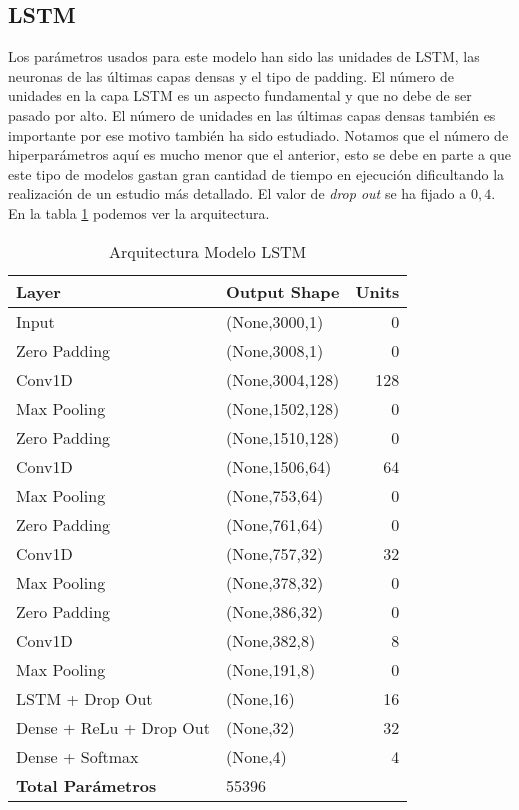     \subsection{LSTM}
        Los parámetros usados para este modelo han sido las unidades de LSTM, las neuronas de las últimas capas densas y el tipo de padding. El número de unidades en la capa LSTM es un aspecto fundamental y que no debe de ser pasado por alto. El número de unidades en las últimas capas densas también es importante por ese motivo también ha sido estudiado. Notamos que el número de hiperparámetros aquí es mucho menor que el anterior, esto se debe en parte a que este tipo de modelos gastan gran cantidad de tiempo en ejecución dificultando la realización de un estudio más detallado. El valor de \textit{drop out} se ha fijado a $0,4$. En la tabla \ref{table:arquitectura modelo lstm} podemos ver la arquitectura. \\
        
    
        \begin{table}[htpb]
            \caption{Arquitectura Modelo LSTM}
            \begin{center}
            \begin{tabular}{|l|l|r|}
            \hline
            \textbf{Layer} & \textbf{Output Shape} & \multicolumn{1}{l|}{\textbf{Units}} \\ \hline
            Input & (None,3000,1) & 0 \\ \hline
            Zero Padding & (None,3008,1) & 0 \\ \hline
            Conv1D & (None,3004,128) & 128 \\ \hline
            Max Pooling & (None,1502,128) & 0 \\ \hline
            Zero Padding & (None,1510,128) & 0 \\ \hline
            Conv1D & (None,1506,64) & 64 \\ \hline
            Max Pooling & (None,753,64) & 0 \\ \hline
            Zero Padding & (None,761,64) & 0 \\ \hline
            Conv1D & (None,757,32) & 32 \\ \hline
            Max Pooling & (None,378,32) & 0 \\ \hline
            Zero Padding & (None,386,32) & 0 \\ \hline
            Conv1D & (None,382,8) & 8 \\ \hline
            Max Pooling & (None,191,8) & 0 \\ \hline
            LSTM + Drop Out & (None,16) & 16 \\ \hline
            Dense + ReLu + Drop Out & (None,32) & 32 \\ \hline
            Dense + Softmax & (None,4) & 4 \\ \hline
            \textbf{Total Parámetros} & 55396 & \\ \hline
            \end{tabular}
            \end{center}
            \label{table:arquitectura modelo lstm}
            \end{table}
            
